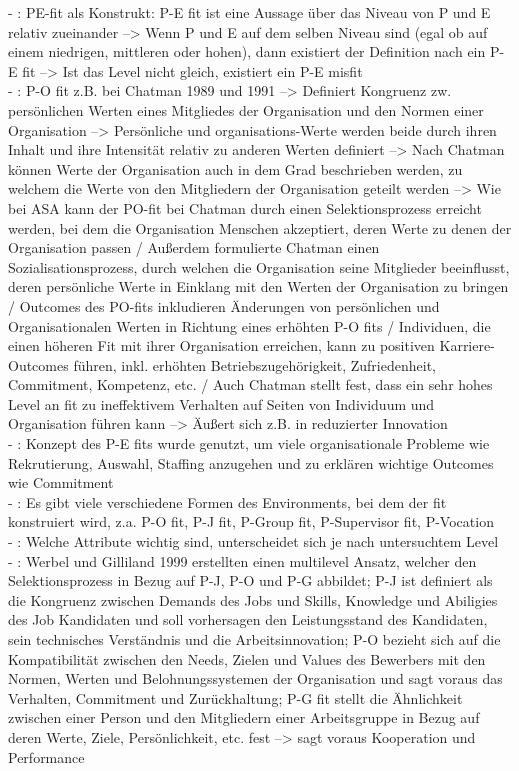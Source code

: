 - \cite[S. 53]{edwards:2008}: PE-fit als Konstrukt: P-E fit ist eine Aussage über das Niveau von P und E relativ zueinander --> Wenn P und E auf dem selben Niveau sind (egal ob auf einem niedrigen, mittleren oder hohen), dann existiert der Definition nach ein P-E fit --> Ist das Level nicht gleich, existiert ein P-E misfit \\
- \cite[S. 4]{su:2015}: P-O fit z.B. bei Chatman 1989 und 1991 --> Definiert Kongruenz zw. persönlichen Werten eines Mitgliedes der Organisation und den Normen einer Organisation --> Persönliche und organisations-Werte werden beide durch ihren Inhalt und ihre Intensität relativ zu anderen Werten definiert --> Nach Chatman können Werte der Organisation auch in dem Grad beschrieben werden, zu welchem die Werte von den Mitgliedern der Organisation geteilt werden --> Wie bei ASA kann der PO-fit bei Chatman durch einen Selektionsprozess erreicht werden, bei dem die Organisation Menschen akzeptiert, deren Werte zu denen der Organisation passen / Außerdem formulierte Chatman einen Sozialisationsprozess, durch welchen die Organisation seine Mitglieder beeinflusst, deren persönliche Werte in Einklang mit den Werten der Organisation zu bringen / Outcomes des PO-fits inkludieren Änderungen von persönlichen und Organisationalen Werten in Richtung eines erhöhten P-O fits / Individuen, die einen höheren Fit mit ihrer Organisation erreichen, kann zu positiven Karriere-Outcomes führen, inkl. erhöhten Betriebszugehörigkeit, Zufriedenheit, Commitment, Kompetenz, etc. / Auch Chatman stellt fest, dass ein sehr hohes Level an fit zu ineffektivem Verhalten auf Seiten von Individuum und Organisation führen kann --> Äußert sich z.B. in reduzierter Innovation \\
- \cite[S. 5]{su:2015}: Konzept des P-E fits wurde genutzt, um viele organisationale Probleme wie Rekrutierung, Auswahl, Staffing anzugehen und zu erklären wichtige Outcomes wie Commitment \\
- \cite[S. 5]{su:2015}: Es gibt viele verschiedene Formen des Environments, bei dem der fit konstruiert wird, z.a. P-O fit, P-J fit, P-Group fit, P-Supervisor fit, P-Vocation \\
- \cite[S. 5]{su:2015}: Welche Attribute wichtig sind, unterscheidet sich je nach untersuchtem Level \\
- \cite[S. 5]{su:2015}: Werbel und Gilliland 1999 erstellten einen multilevel Ansatz, welcher den Selektionsprozess in Bezug auf P-J, P-O und P-G abbildet; P-J ist definiert als die Kongruenz zwischen Demands des Jobs und Skills, Knowledge und Abiligies des Job Kandidaten und soll vorhersagen den Leistungsstand des Kandidaten, sein technisches Verständnis und die Arbeitsinnovation; P-O bezieht sich auf die Kompatibilität zwischen den Needs, Zielen und Values des Bewerbers mit den Normen, Werten und Belohnungssystemen der Organisation und sagt voraus das Verhalten, Commitment und Zurückhaltung; P-G fit stellt die Ähnlichkeit zwischen einer Person und den Mitgliedern einer Arbeitsgruppe in Bezug auf deren Werte, Ziele, Persönlichkeit, etc. fest --> sagt voraus Kooperation und Performance \\
